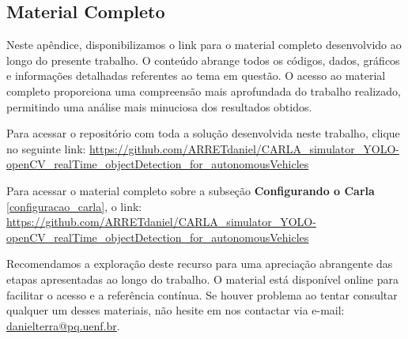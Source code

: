 \documentclass[
	12pt,				%
	oneside, %
	a4paper,			%
	english,			%
	french,				%
	spanish,			%
	brazil				%
	]{abntex2}
\begin{document}
%
%


\begin{apendicesenv} 

\partapendices 

\chapter{Material Completo} \label{apendices} 

Neste apêndice, disponibilizamos o link para o material completo desenvolvido ao longo do presente trabalho. O conteúdo abrange todos os códigos, dados, gráficos e informações detalhadas referentes ao tema em questão. O acesso ao material completo proporciona uma compreensão mais aprofundada do trabalho realizado, permitindo uma análise mais minuciosa dos resultados obtidos.

Para acessar o repositório com toda a solução desenvolvida neste trabalho, clique no seguinte link: \url{https://github.com/ARRETdaniel/CARLA_simulator_YOLO-openCV_realTime_objectDetection_for_autonomousVehicles}

Para acessar o material completo sobre a subseção \textbf{Configurando o Carla} \ref{configuracao_carla}, o link: \url{https://github.com/ARRETdaniel/CARLA_simulator_YOLO-openCV_realTime_objectDetection_for_autonomousVehicles}


Recomendamos a exploração deste recurso para uma apreciação abrangente das etapas apresentadas ao longo do trabalho. O material está disponível online para facilitar o acesso e a referência contínua. Se houver problema ao tentar consultar qualquer um desses materiais, não hesite em nos contactar via e-mail: \href{mailto:danielterra@pq.uenf.br}{danielterra@pq.uenf.br}.


\end{apendicesenv}
\end{document}
